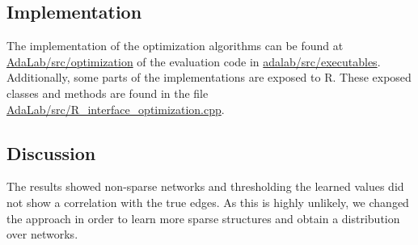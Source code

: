 \subsection{ Implementation }
The implementation of the optimization algorithms can be found at \url{AdaLab/src/optimization} of the evaluation code in \url{adalab/src/executables}. Additionally, 
some parts of the implementations are exposed to R. These exposed classes and methods are found in the file \url{AdaLab/src/R_interface_optimization.cpp}.
\subsection{Discussion}
The results showed non-sparse networks and thresholding the learned values did not show a correlation with the true edges. As this is highly unlikely, we changed the approach in order to learn more sparse structures and
obtain a distribution over networks.

